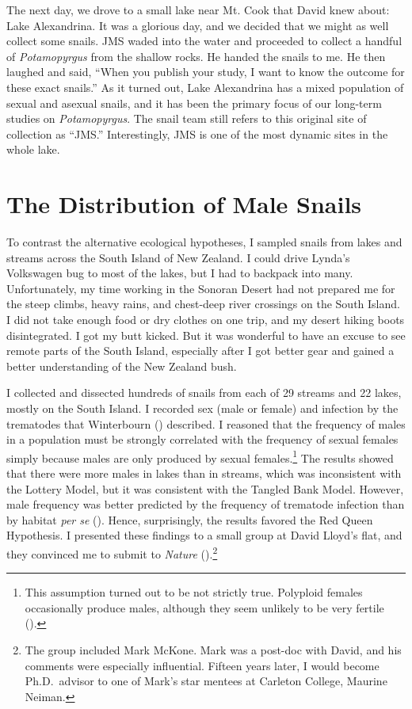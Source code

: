 \documentclass[
  letterpaper,
]{book}
\begin{document}
The next day, we drove to a small lake near Mt. Cook that David knew
about: Lake Alexandrina. It was a glorious day, and we decided that we
might as well collect some snails. JMS waded into the water and
proceeded to collect a handful of \emph{Potamopyrgus} from the shallow
rocks. He handed the snails to me. He then laughed and said, ``When you
publish your study, I want to know the outcome for these exact snails.''
As it turned out, Lake Alexandrina has a mixed population of sexual and
asexual snails, and it has been the primary focus of our long-term
studies on \emph{Potamopyrgus}. The snail team still refers to this
original site of collection as ``JMS.'' Interestingly, JMS is one of the
most dynamic sites in the whole lake.

\section{The Distribution of Male
Snails}\label{the-distribution-of-male-snails}

To contrast the alternative ecological hypotheses, I sampled snails from
lakes and streams across the South Island of New Zealand. I could drive
Lynda's Volkswagen bug to most of the lakes, but I had to backpack into
many. Unfortunately, my time working in the Sonoran Desert had not
prepared me for the steep climbs, heavy rains, and chest-deep river
crossings on the South Island. I did not take enough food or dry clothes
on one trip, and my desert hiking boots disintegrated. I got my butt
kicked. But it was wonderful to have an excuse to see remote parts of
the South Island, especially after I got better gear and gained a better
understanding of the New Zealand bush.

I collected and dissected hundreds of snails from each of 29 streams and
22 lakes, mostly on the South Island. I recorded sex (male or female)
and infection by the trematodes that Winterbourn
() described. I reasoned that the
frequency of males in a population must be strongly correlated with the
frequency of sexual females simply because males are only produced by
sexual females.\footnote{This assumption turned out to be not strictly
  true. Polyploid females occasionally produce males, although they seem
  unlikely to be very fertile ().} The results showed that there were more males in lakes
than in streams, which was inconsistent with the Lottery Model, but it
was consistent with the Tangled Bank Model. However, male frequency was
better predicted by the frequency of trematode infection than by habitat
\emph{per se} (). Hence,
surprisingly, the results favored the Red Queen Hypothesis. I presented
these findings to a small group at David Lloyd's flat, and they
convinced me to submit to \emph{Nature}
().\footnote{The group included Mark
  McKone. Mark was a post-doc with David, and his comments were
  especially influential. Fifteen years later, I would become
  Ph.D.~advisor to one of Mark's star mentees at Carleton College,
  Maurine Neiman.}
\end{document}
